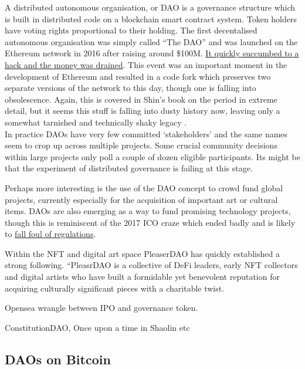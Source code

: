 A distributed autonomous organisation, or DAO is a governance structure which is built in distributed code on a blockchain smart contract system. Token holders have voting rights proportional to their holding. The first decentalised autonomous organisation was simply called ``The DAO'' and was launched on the Ethereum network in 2016 after raising around \$100M. \href{https://www.gemini.com/cryptopedia/the-dao-hack-makerdao#section-what-is-a-dao}{It quickly succumbed to a hack and the money was drained}. This event was an important moment in the development of Ethereum and resulted in a code fork which preserves two separate versions of the network to this day, though one is falling into obsolescence. Again, this is covered in Shin's book on the period in extreme detail, but it seems this stuff is falling into dusty history now, leaving only a somewhat tarnished and technically shaky legacy \cite{cryptopians}. \\
In practice DAOs have very few committed `stakeholders' and the same names seem to crop up across multiple projects. Some crucial community decisions within large projects only poll a couple of dozen eligible participants. Its might be that the experiment of distributed governance is failing at this stage. \par
Perhaps more interesting is the use of the DAO concept to crowd fund global projects, currently especially for the acquisition of important art or cultural items. DAOs are also emerging as a way to fund promising technology projects, though this is reminiscent of the 2017 ICO craze which ended badly and is likely to \href{https://www.cftc.gov/PressRoom/PressReleases/8590-22}{fall foul of regulations}.\par
Within the NFT and digital art space  PleaserDAO has quickly established a strong following.
``PleasrDAO is a collective of DeFi leaders, early NFT collectors and digital artists who have built a formidable yet benevolent reputation for acquiring culturally significant pieces with a charitable twist.\par
Opensea wrangle between IPO and governance token.\par
ConstitutionDAO, Once upon a time in Shaolin etc 

\subsection{DAOs on Bitcoin}
